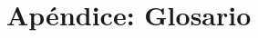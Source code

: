 \documentclass[11pt, a4paper, twoside]{report}
\begin{document}
	\newpage
	\appendix
	\section{Apéndice: Glosario} \label{srs:glosario}
	\printglossary 

	\newpage

	\newpage
	\listoffigures

	\newpage
	\nocite{IEEE:1074}
	\nocite{IEEE:830}
	
	
	
	\listoftodos
\end{document}
